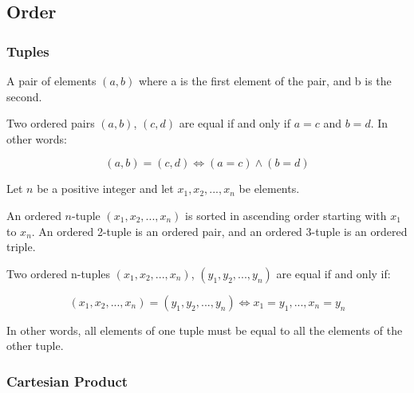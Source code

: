 \documentclass[11pt]{article}
\begin{document}
\newpage

\subsection{Order}

\subsubsection{Tuples}

\begin{definition}\label{def:ordered-pair}
    A pair of elements $(a, b)$ where a is the first
    element of the pair, and b is the second. 
\end{definition}

\begin{definition}\label{def:ordered-pair-eq}
    Two ordered pairs $(a,b)$, $(c,d)$ are equal if and only if
    $a = c$ and $b = d$. In other words:

    \begin{equation}
        (a,b) = (c,d) \iff (a = c) \land (b = d)
    \end{equation}
\end{definition}

\begin{definition}[Tuples]\label{def:tuple}
    Let $n$ be a positive integer and let $x_1, x_2, ... , x_n$ be elements.

    An ordered $n$-tuple $(x_1, x_2, ... , x_n)$ is sorted in ascending order
    starting with $x_1$ to $x_n$. An ordered 2-tuple is an ordered pair,
    and an ordered 3-tuple is an ordered triple.
\end{definition}

\begin{definition}\label{def:tuple-eq}
    Two ordered n-tuples $(x_1, x_2, ..., x_n)$, $(y_1, y_2, ..., y_n)$
    are equal if and only if:

    \begin{equation}
        (x_1, x_2, ..., x_n) = (y_1, y_2, ..., y_n) \iff x_1 = y_1, ..., x_n = y_n
    \end{equation}
\end{definition}

In other words, all elements of one tuple must be equal to all the elements of the other tuple.

\subsubsection{Cartesian Product}
\end{document}
